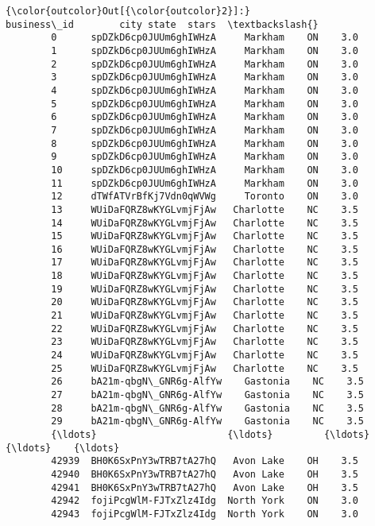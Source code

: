 \documentclass[11pt]{article}
\begin{document}
\begin{Verbatim}[commandchars=\\\{\}]
{\color{outcolor}Out[{\color{outcolor}2}]:}                   business\_id        city state  stars  \textbackslash{}
        0      spDZkD6cp0JUUm6ghIWHzA     Markham    ON    3.0   
        1      spDZkD6cp0JUUm6ghIWHzA     Markham    ON    3.0   
        2      spDZkD6cp0JUUm6ghIWHzA     Markham    ON    3.0   
        3      spDZkD6cp0JUUm6ghIWHzA     Markham    ON    3.0   
        4      spDZkD6cp0JUUm6ghIWHzA     Markham    ON    3.0   
        5      spDZkD6cp0JUUm6ghIWHzA     Markham    ON    3.0   
        6      spDZkD6cp0JUUm6ghIWHzA     Markham    ON    3.0   
        7      spDZkD6cp0JUUm6ghIWHzA     Markham    ON    3.0   
        8      spDZkD6cp0JUUm6ghIWHzA     Markham    ON    3.0   
        9      spDZkD6cp0JUUm6ghIWHzA     Markham    ON    3.0   
        10     spDZkD6cp0JUUm6ghIWHzA     Markham    ON    3.0   
        11     spDZkD6cp0JUUm6ghIWHzA     Markham    ON    3.0   
        12     dTWfATVrBfKj7Vdn0qWVWg     Toronto    ON    3.0   
        13     WUiDaFQRZ8wKYGLvmjFjAw   Charlotte    NC    3.5   
        14     WUiDaFQRZ8wKYGLvmjFjAw   Charlotte    NC    3.5   
        15     WUiDaFQRZ8wKYGLvmjFjAw   Charlotte    NC    3.5   
        16     WUiDaFQRZ8wKYGLvmjFjAw   Charlotte    NC    3.5   
        17     WUiDaFQRZ8wKYGLvmjFjAw   Charlotte    NC    3.5   
        18     WUiDaFQRZ8wKYGLvmjFjAw   Charlotte    NC    3.5   
        19     WUiDaFQRZ8wKYGLvmjFjAw   Charlotte    NC    3.5   
        20     WUiDaFQRZ8wKYGLvmjFjAw   Charlotte    NC    3.5   
        21     WUiDaFQRZ8wKYGLvmjFjAw   Charlotte    NC    3.5   
        22     WUiDaFQRZ8wKYGLvmjFjAw   Charlotte    NC    3.5   
        23     WUiDaFQRZ8wKYGLvmjFjAw   Charlotte    NC    3.5   
        24     WUiDaFQRZ8wKYGLvmjFjAw   Charlotte    NC    3.5   
        25     WUiDaFQRZ8wKYGLvmjFjAw   Charlotte    NC    3.5   
        26     bA21m-qbgN\_GNR6g-AlfYw    Gastonia    NC    3.5   
        27     bA21m-qbgN\_GNR6g-AlfYw    Gastonia    NC    3.5   
        28     bA21m-qbgN\_GNR6g-AlfYw    Gastonia    NC    3.5   
        29     bA21m-qbgN\_GNR6g-AlfYw    Gastonia    NC    3.5   
        {\ldots}                       {\ldots}         {\ldots}   {\ldots}    {\ldots}   
        42939  BH0K6SxPnY3wTRB7tA27hQ   Avon Lake    OH    3.5   
        42940  BH0K6SxPnY3wTRB7tA27hQ   Avon Lake    OH    3.5   
        42941  BH0K6SxPnY3wTRB7tA27hQ   Avon Lake    OH    3.5   
        42942  fojiPcgWlM-FJTxZlz4Idg  North York    ON    3.0   
        42943  fojiPcgWlM-FJTxZlz4Idg  North York    ON    3.0   

\end{Verbatim}
\end{document}
